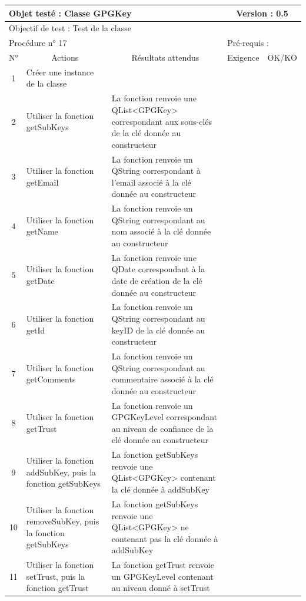 \documentclass{../res/univ-projet}
\begin{document}
\begin{center}
    \begin{tabular}{|c|p{5cm}|p{5cm}|p{1.5cm}|p{1.5cm}|}
      \hline
      \multicolumn{3}{|l|}{Objet testé : Classe GPGKey} & \multicolumn{2}{c|}{Version : 0.5}\\ \hline
      \multicolumn{5}{|l|}{Objectif de test : Test de la classe}\\ \hline
      \multicolumn{3}{|l|}{Procédure n° 17} & \multicolumn{2}{p{3cm}|}{Pré-requis : }\\ \hline
      \multicolumn{1}{|c|}{N°} & \multicolumn{1}{c|}{Actions} & \multicolumn{1}{c|}{Résultats attendus} & 
      \multicolumn{1}{c|}{Exigence} & \multicolumn{1}{c|}{OK/KO}\\ \hline
      1 & Créer une instance de la classe &  &  & \\
      2 & Utiliser la fonction getSubKeys & La fonction renvoie une QList<GPGKey> correspondant aux sous-clés de la clé donnée au constructeur &  & \\
      3 & Utiliser la fonction getEmail & La fonction renvoie un QString correspondant à l'email associé à la clé donnée au constructeur &  & \\
      4 & Utiliser la fonction getName & La fonction renvoie un QString correspondant au nom associé à la clé donnée au constructeur &  & \\
      5 & Utiliser la fonction getDate & La fonction renvoie une QDate correspondant à la date de création de la clé donnée au constructeur &  & \\
	  6 & Utiliser la fonction getId & La fonction renvoie un QString correspondant au keyID de la clé donnée au constructeur &  & \\
      7 & Utiliser la fonction getComments & La fonction renvoie un QString correspondant au commentaire associé à la clé donnée au constructeur &  & \\
      8 & Utiliser la fonction getTrust & La fonction renvoie un GPGKeyLevel correspondant au niveau de confiance de la clé donnée au constructeur &  & \\
      9 & Utiliser la fonction addSubKey, puis la fonction getSubKeys & La fonction getSubKeys renvoie une QList<GPGKey> contenant la clé donnée à addSubKey &  & \\
      10 & Utiliser la fonction removeSubKey, puis la fonction getSubKeys & La fonction getSubKeys renvoie une QList<GPGKey> ne contenant pas la clé donnée à addSubKey &  &\\ 
	  11 & Utiliser la fonction setTrust, puis la fonction getTrust & La fonction getTrust renvoie un GPGKeyLevel contenant au niveau donné à setTrust &  &\\ 
	\hline
    \end{tabular}
    \vskip 2.2cm


\end{center}
\end{document}
